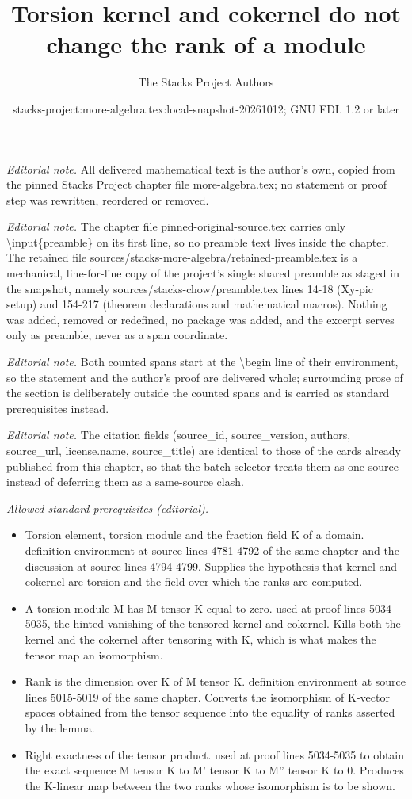 \documentclass[10pt,a4paper]{amsart}
\title{Torsion kernel and cokernel do not change the rank of a module}
\author{The Stacks Project Authors}
\date{stacks-project:more-algebra.tex:local-snapshot-20261012; GNU FDL 1.2 or later}
\theoremstyle{plain}
\theoremstyle{definition}
\theoremstyle{remark}
\numberwithin{equation}{subsection}
\begin{document}
\maketitle
\setcounter{subsection}{1}
\noindent\textit{Editorial note.} All delivered mathematical text is the author's own, copied from the pinned Stacks Project chapter file more-algebra.tex; no statement or proof step was rewritten, reordered or removed.\par\medskip
\noindent\textit{Editorial note.} The chapter file pinned-original-source.tex carries only \textbackslash{}input\{preamble\} on its first line, so no preamble text lives inside the chapter. The retained file sources/stacks-more-algebra/retained-preamble.tex is a mechanical, line-for-line copy of the project's single shared preamble as staged in the snapshot, namely sources/stacks-chow/preamble.tex lines 14-18 (Xy-pic setup) and 154-217 (theorem declarations and mathematical macros). Nothing was added, removed or redefined, no package was added, and the excerpt serves only as preamble, never as a span coordinate.\par\medskip
\noindent\textit{Editorial note.} Both counted spans start at the \textbackslash{}begin line of their environment, so the statement and the author's proof are delivered whole; surrounding prose of the section is deliberately outside the counted spans and is carried as standard prerequisites instead.\par\medskip
\noindent\textit{Editorial note.} The citation fields (source\_id, source\_version, authors, source\_url, license.name, source\_title) are identical to those of the cards already published from this chapter, so that the batch selector treats them as one source instead of deferring them as a same-source clash.\par\medskip
\noindent\textit{Allowed standard prerequisites (editorial).}\begin{itemize}
\item Torsion element, torsion module and the fraction field K of a domain. definition environment at source lines 4781-4792 of the same chapter and the discussion at source lines 4794-4799. Supplies the hypothesis that kernel and cokernel are torsion and the field over which the ranks are computed.
\item A torsion module M has M tensor K equal to zero. used at proof lines 5034-5035, the hinted vanishing of the tensored kernel and cokernel. Kills both the kernel and the cokernel after tensoring with K, which is what makes the tensor map an isomorphism.
\item Rank is the dimension over K of M tensor K. definition environment at source lines 5015-5019 of the same chapter. Converts the isomorphism of K-vector spaces obtained from the tensor sequence into the equality of ranks asserted by the lemma.
\item Right exactness of the tensor product. used at proof lines 5034-5035 to obtain the exact sequence M tensor K to M' tensor K to M'' tensor K to 0. Produces the K-linear map between the two ranks whose isomorphism is to be shown.
\end{itemize}\medskip
\end{document}
